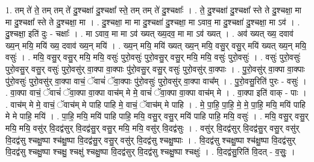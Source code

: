 \documentclass[17pt]{extarticle}
\begin{document}
1. तम् ते॑ ते॒ तम् तम् ते॑ दु॒श्चक्षा॑ दु॒श्चक्षा᳚ स्ते॒ तम् तम् ते॑ दु॒श्चक्षाः᳚ । . ते॒ दु॒श्चक्षा॑ दु॒श्चक्षा᳚ स्ते ते दु॒श्चक्षा॒ मा मा दु॒श्चक्षा᳚ स्ते ते दु॒श्चक्षा॒ मा । . दु॒श्चक्षा॒ मा मा दु॒श्चक्षा॑ दु॒श्चक्षा॒ मा ऽवाव॒ मा दु॒श्चक्षा॑ दु॒श्चक्षा॒ मा ऽव॑ । . दु॒श्चक्षा॒ इति॑ दुः - चक्षाः᳚ । . मा ऽवाव॒ मा मा ऽव॑ ख्यत् ख्य॒दव॒ मा मा ऽव॑ ख्यत् । . अव॑ ख्यत् ख्य॒ दवाव॑ ख्य॒न् मयि॒ मयि॑ ख्य॒ दवाव॑ ख्य॒न् मयि॑ । . ख्य॒न् मयि॒ मयि॑ ख्यत् ख्य॒न् मयि॒ वसु॒र् वसु॒र् मयि॑ ख्यत् ख्य॒न् मयि॒ वसुः॑ । . मयि॒ वसु॒र् वसु॒र् मयि॒ मयि॒ वसुः॑ पुरो॒वसुः॑ पुरो॒वसु॒र् वसु॒र् मयि॒ मयि॒ वसुः॑ पुरो॒वसुः॑ । . वसुः॑ पुरो॒वसुः॑ पुरो॒वसु॒र् वसु॒र् वसुः॑ पुरो॒वसु॑र् वा॒क्पा वा॒क्पाः पु॑रो॒वसु॒र् वसु॒र् वसुः॑ पुरो॒वसु॑र् वा॒क्पाः । . पु॒रो॒वसु॑र् वा॒क्पा वा॒क्पाः पु॑रो॒वसुः॑ पुरो॒वसु॑र् वा॒क्पा वाचं॒ ॅवाचं॑ ॅवा॒क्पाः पु॑रो॒वसुः॑ पुरो॒वसु॑र् वा॒क्पा वाच᳚म् । . पु॒रो॒वसु॒रिति॑ पुरः - वसुः॑ । . वा॒क्पा वाचं॒ ॅवाचं॑ ॅवा॒क्पा वा॒क्पा वाच॑म् मे मे॒ वाचं॑ ॅवा॒क्पा वा॒क्पा वाच॑म् मे । . वा॒क्पा इति॑ वाक् - पाः । . वाच॑म् मे मे॒ वाचं॒ ॅवाच॑म् मे पाहि पाहि मे॒ वाचं॒ ॅवाच॑म् मे पाहि । . मे॒ पा॒हि॒ पा॒हि॒ मे॒ मे॒ पा॒हि॒ मयि॒ मयि॑ पाहि मे मे पाहि॒ मयि॑ । . पा॒हि॒ मयि॒ मयि॑ पाहि पाहि॒ मयि॒ वसु॒र् वसु॒र् मयि॑ पाहि पाहि॒ मयि॒ वसुः॑ । . मयि॒ वसु॒र् वसु॒र् मयि॒ मयि॒ वसु॑र् वि॒दद्व॑सुर् वि॒दद्व॑सु॒र् वसु॒र् मयि॒ मयि॒ वसु॑र् वि॒दद्व॑सुः । . वसु॑र् वि॒दद्व॑सुर् वि॒दद्व॑सु॒र् वसु॒र् वसु॑र् वि॒दद्व॑सु श्चक्षु॒ष्पा श्च॑क्षु॒ष्पा वि॒दद्व॑सु॒र् वसु॒र् वसु॑र् वि॒दद्व॑सु श्चक्षु॒ष्पाः । . वि॒दद्व॑सु श्चक्षु॒ष्पा श्च॑क्षु॒ष्पा वि॒दद्व॑सुर् वि॒दद्व॑सु श्चक्षु॒ष्पा श्चक्षु॒ श्चक्षु॑ श्चक्षु॒ष्पा वि॒दद्व॑सुर् वि॒दद्व॑सु श्चक्षु॒ष्पा श्चक्षुः॑ । . वि॒दद्व॑सु॒रिति॑ वि॒दत् - व॒सुः॒ । \newline
\end{document}
